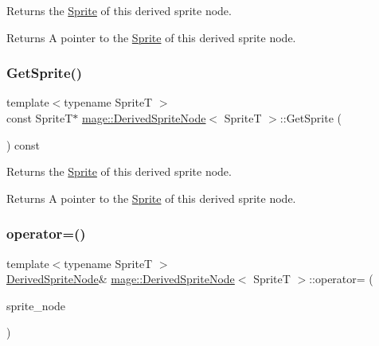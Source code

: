 Returns the \hyperlink{classmage_1_1_sprite}{Sprite} of this derived sprite node.

\begin{DoxyReturn}{Returns}
A pointer to the \hyperlink{classmage_1_1_sprite}{Sprite} of this derived sprite node. 
\end{DoxyReturn}
\hypertarget{classmage_1_1_derived_sprite_node_a9daf3412c118dcb50f0175d3d00be9bc}{}\label{classmage_1_1_derived_sprite_node_a9daf3412c118dcb50f0175d3d00be9bc} 
\subsubsection{\texorpdfstring{Get\+Sprite()}{GetSprite()}\hspace{0.1cm}{\footnotesize\ttfamily [2/2]}}
{\footnotesize\ttfamily template$<$typename SpriteT $>$ \\
const SpriteT$\ast$ \hyperlink{classmage_1_1_derived_sprite_node}{mage\+::\+Derived\+Sprite\+Node}$<$ SpriteT $>$\+::Get\+Sprite (\begin{DoxyParamCaption}{ }\end{DoxyParamCaption}) const\hspace{0.3cm}{\ttfamily [noexcept]}}

Returns the \hyperlink{classmage_1_1_sprite}{Sprite} of this derived sprite node.

\begin{DoxyReturn}{Returns}
A pointer to the \hyperlink{classmage_1_1_sprite}{Sprite} of this derived sprite node. 
\end{DoxyReturn}
\hypertarget{classmage_1_1_derived_sprite_node_a1dd542f0e851b1e289bb127691f0800b}{}\label{classmage_1_1_derived_sprite_node_a1dd542f0e851b1e289bb127691f0800b} 
\subsubsection{\texorpdfstring{operator=()}{operator=()}\hspace{0.1cm}{\footnotesize\ttfamily [1/2]}}
{\footnotesize\ttfamily template$<$typename SpriteT $>$ \\
\hyperlink{classmage_1_1_derived_sprite_node}{Derived\+Sprite\+Node}\& \hyperlink{classmage_1_1_derived_sprite_node}{mage\+::\+Derived\+Sprite\+Node}$<$ SpriteT $>$\+::operator= (\begin{DoxyParamCaption}\item[{const \hyperlink{classmage_1_1_derived_sprite_node}{Derived\+Sprite\+Node}$<$ SpriteT $>$ \&}]{sprite\+\_\+node }\end{DoxyParamCaption})\hspace{0.3cm}{\ttfamily [delete]}}


